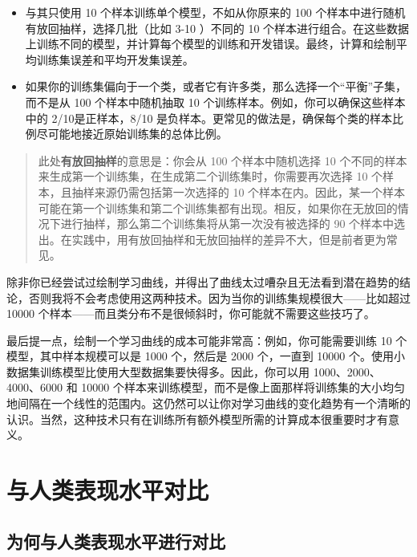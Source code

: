 \begin{itemize}
\tightlist
\item
  与其只使用 10 个样本训练单个模型，不如从你原来的 100
  个样本中进行随机有放回抽样，选择几批（比如 3-10 ）不同的 10
  个样本进行组合。在这些数据上训练不同的模型，并计算每个模型的训练和开发错误。最终，计算和绘制平均训练集误差和平均开发集误差。
\item
  如果你的训练集偏向于一个类，或者它有许多类，那么选择一个``平衡''子集，而不是从
  100 个样本中随机抽取 10 个训练样本。例如，你可以确保这些样本中的
  2/10是正样本，8/10
  是负样本。更常见的做法是，确保每个类的样本比例尽可能地接近原始训练集的总体比例。
\end{itemize}

\begin{quote}
此处\textbf{有放回抽样}的意思是：你会从 100 个样本中随机选择 10
个不同的样本来生成第一个训练集，在生成第二个训练集时，你需要再次选择 10
个样本，且抽样来源仍需包括第一次选择的 10
个样本在内。因此，某一个样本可能在第一个训练集和第二个训练集都有出现。相反，如果你在无放回的情况下进行抽样，那么第二个训练集将从第一次没有被选择的
90
个样本中选出。在实践中，用有放回抽样和无放回抽样的差异不大，但是前者更为常见。
\end{quote}

除非你已经尝试过绘制学习曲线，并得出了曲线太过嘈杂且无法看到潜在趋势的结论，否则我将不会考虑使用这两种技术。因为当你的训练集规模很大------比如超过
10000 个样本------而且类分布不是很倾斜时，你可能就不需要这些技巧了。

最后提一点，绘制一个学习曲线的成本可能非常高：例如，你可能需要训练 10
个模型，其中样本规模可以是 1000 个，然后是 2000 个，一直到 10000
个。使用小数据集训练模型比使用大型数据集要快得多。因此，你可以用
1000、2000、4000、6000 和 10000
个样本来训练模型，而不是像上面那样将训练集的大小均匀地间隔在一个线性的范围内。这仍然可以让你对学习曲线的变化趋势有一个清晰的认识。当然，这种技术只有在训练所有额外模型所需的计算成本很重要时才有意义。

\hypertarget{ux4e0eux4ebaux7c7bux8868ux73b0ux6c34ux5e73ux5bf9ux6bd4}{%
\part{与人类表现水平对比}\label{ux4e0eux4ebaux7c7bux8868ux73b0ux6c34ux5e73ux5bf9ux6bd4}}

\hypertarget{ux4e3aux4f55ux4e0eux4ebaux7c7bux8868ux73b0ux6c34ux5e73ux8fdbux884cux5bf9ux6bd4}{%
\chapter{为何与人类表现水平进行对比}\label{ux4e3aux4f55ux4e0eux4ebaux7c7bux8868ux73b0ux6c34ux5e73ux8fdbux884cux5bf9ux6bd4}}

